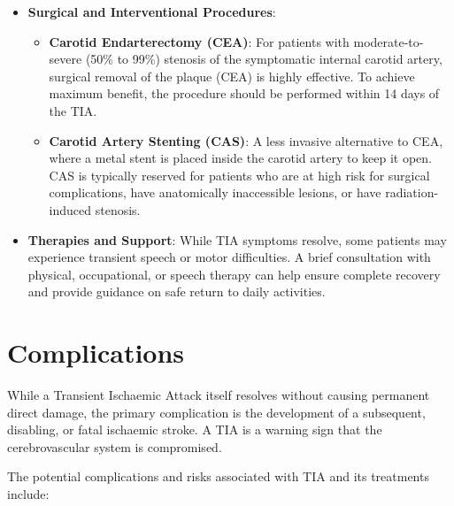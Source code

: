 \begin{itemize}
    \item \textbf{Surgical and Interventional Procedures}:
    \begin{itemize}
        \item \textbf{Carotid Endarterectomy (CEA)}: For patients with moderate-to-severe (50\% to 99\%) stenosis of the symptomatic internal carotid artery, surgical removal of the plaque (CEA) is highly effective. To achieve maximum benefit, the procedure should be performed within 14 days of the TIA.
        \item \textbf{Carotid Artery Stenting (CAS)}: A less invasive alternative to CEA, where a metal stent is placed inside the carotid artery to keep it open. CAS is typically reserved for patients who are at high risk for surgical complications, have anatomically inaccessible lesions, or have radiation-induced stenosis.
    \end{itemize}

    \item \textbf{Therapies and Support}: While TIA symptoms resolve, some patients may experience transient speech or motor difficulties. A brief consultation with physical, occupational, or speech therapy can help ensure complete recovery and provide guidance on safe return to daily activities.
\end{itemize}

\section*{Complications}
While a Transient Ischaemic Attack itself resolves without causing permanent direct damage, the primary complication is the development of a subsequent, disabling, or fatal ischaemic stroke. A TIA is a warning sign that the cerebrovascular system is compromised.

The potential complications and risks associated with TIA and its treatments include:


